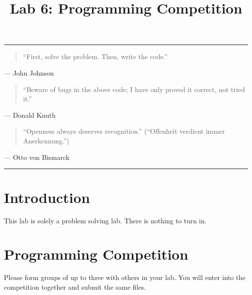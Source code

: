 \documentclass[11pt]{cselabheader}
\title{Lab 6: Programming Competition}
\theoremstyle{plain}
\begin{document}
\maketitle

\hrule

\begin{quotation}
  ``First, solve the problem. Then, write the code.''
\end{quotation}
\begin{flushright}
  --- John Johnson
\end{flushright}

\begin{quotation} ``Beware of bugs in the above code; I have only proved it
  correct, not tried it.''
\end{quotation}
\begin{flushright}
  --- Donald Knuth
\end{flushright}

\begin{quotation}
  ``Openness always deserves recognition.'' (``Offenheit verdient immer
  Anerkennung.'')
\end{quotation}
\begin{flushright}
  --- Otto von Bismarck

\end{flushright}

\hrule

\tableofcontents

\pagebreak

\section{Introduction}
This lab is solely a problem solving lab. There is nothing to turn in.

\section{Programming Competition}
Please form groups of up to three with others in your lab. You will
enter into the competition together and submit the same files.
\end{document}
